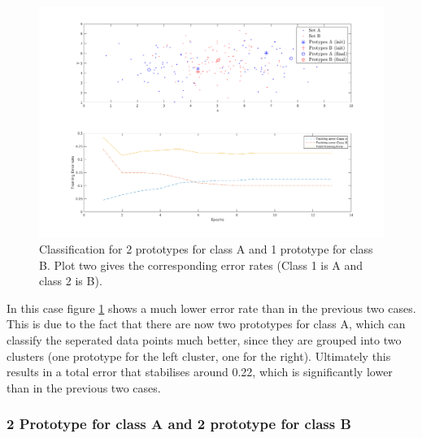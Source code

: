 \documentclass[10pt]{article}
\begin{document}
\begin{figure}[H]
 \centering
 \includegraphics[width=\textwidth]{Fig12_c.png}
 \caption{Classification for 2 prototypes for class A and 1 prototype for class B. Plot two gives the corresponding error rates (Class 1 is A and class 2 is B).}
 \label{fig1.12c}
\end{figure}
In this case figure \ref{fig1.12c} shows a much lower error rate than in the previous two cases. This is due to the fact that there are now two prototypes for class A, which can classify the seperated data points much better, since they are grouped into two clusters (one prototype for the left cluster, one for the right). Ultimately this results in a total error that stabilises around 0.22, which is significantly lower than in the previous two cases.

\subsubsection{2 Prototype for class A and 2 prototype for class B}
\end{document}
